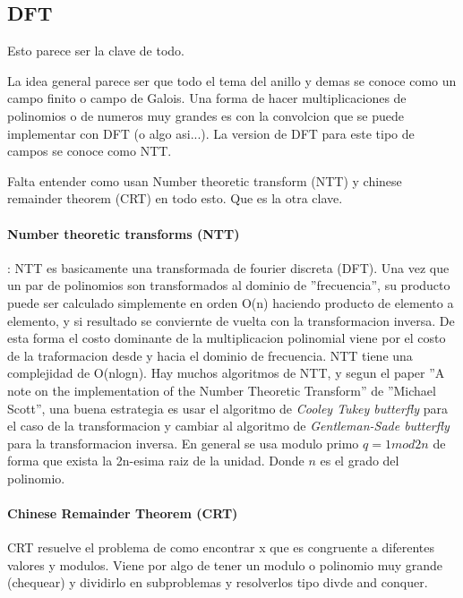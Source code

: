 \documentclass[12pt, oneside]{article}
\begin{document}
\subsection{DFT}
Esto parece ser la clave de todo.


La idea general parece ser que todo el tema del anillo y demas se conoce
como un campo finito o campo de Galois.
Una forma de hacer multiplicaciones  de polinomios o de numeros muy grandes es
con la convolcion que se puede implementar con DFT (o algo asi...).
La version de DFT para este tipo de campos se conoce como NTT.


Falta entender como usan Number theoretic transform (NTT) y chinese remainder
theorem (CRT) en todo esto.
Que es la otra clave.

\paragraph{Number theoretic transforms (NTT)}:
NTT es basicamente una transformada de fourier discreta (DFT).
Una vez que un par de polinomios son transformados al dominio de ''frecuencia'',
su producto puede ser calculado simplemente en orden O(n) haciendo producto de elemento
a elemento, y si resultado se conviernte de vuelta con la transformacion inversa.
De esta forma el costo dominante de la multiplicacion polinomial viene por el costo
de la traformacion desde y hacia el dominio de frecuencia.
NTT tiene una complejidad de O(nlogn).
Hay muchos algoritmos de NTT, y segun el paper ''A note on the implementation of the Number
Theoretic Transform'' de ''Michael Scott'',  una buena estrategia es usar
el algoritmo de \textit{Cooley Tukey butterfly} para el caso de la transformacion
y cambiar al algoritmo de \textit{Gentleman-Sade butterfly} para la transformacion
inversa.
En general se usa modulo primo $q=1 mod 2n$ de forma que exista la 2n-esima raiz de
la unidad.
Donde $n$ es el grado del polinomio.

\paragraph{Chinese Remainder Theorem (CRT)}
CRT resuelve el problema de como encontrar x que es congruente a diferentes valores y modulos.
Viene por algo de tener un modulo o polinomio muy grande (chequear) y dividirlo en
subproblemas y resolverlos tipo divde and conquer.
\end{document}
